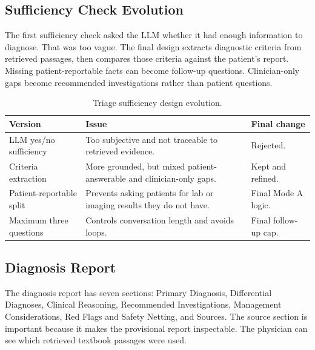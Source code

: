 \subsection{Sufficiency Check Evolution}

The first sufficiency check asked the LLM whether it had enough information to diagnose. That was too vague. The final design extracts diagnostic criteria from retrieved passages, then compares those criteria against the patient's report. Missing patient-reportable facts can become follow-up questions. Clinician-only gaps become recommended investigations rather than patient questions.

\begin{table}[htbp]
\centering
\caption{Triage sufficiency design evolution.}
\label{tab:sufficiency_evolution}
\begin{tabular}{p{} p{} p{}}
\toprule
\textbf{Version} & \textbf{Issue} & \textbf{Final change}\\
\midrule
LLM yes/no sufficiency & Too subjective and not traceable to retrieved evidence. & Rejected.\\
Criteria extraction & More grounded, but mixed patient-answerable and clinician-only gaps. & Kept and refined.\\
Patient-reportable split & Prevents asking patients for lab or imaging results they do not have. & Final Mode A logic.\\
Maximum three questions & Controls conversation length and avoids loops. & Final follow-up cap.\\
\bottomrule
\end{tabular}
\end{table}

\subsection{Diagnosis Report}

The diagnosis report has seven sections: Primary Diagnosis, Differential Diagnoses, Clinical Reasoning, Recommended Investigations, Management Considerations, Red Flags and Safety Netting, and Sources. The source section is important because it makes the provisional report inspectable. The physician can see which retrieved textbook passages were used.

